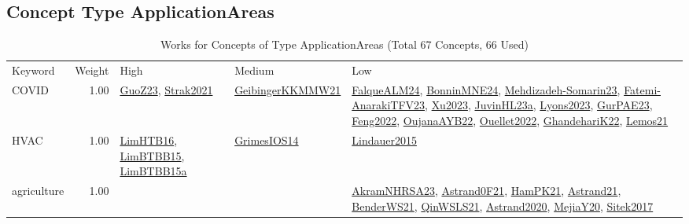 \subsection{Concept Type ApplicationAreas}
\label{sec:ApplicationAreas}
\label{ApplicationAreas}
{\scriptsize
\begin{longtable}{p{3cm}r>{\raggedright\arraybackslash}p{6cm}>{\raggedright\arraybackslash}p{6cm}>{\raggedright\arraybackslash}p{8cm}}
\rowcolor{white}\caption{Works for Concepts of Type ApplicationAreas (Total 67 Concepts, 66 Used)}\\ \toprule
\rowcolor{white}Keyword & Weight & High & Medium & Low\\ \midrule\endhead
\bottomrule
\endfoot
\index{COVID}\index{ApplicationAreas!COVID}COVID &  1.00 & \hyperref[detail:GuoZ23]{GuoZ23}, \hyperref[detail:Strak2021]{Strak2021} & \hyperref[detail:GeibingerKKMMW21]{GeibingerKKMMW21} & \hyperref[detail:FalqueALM24]{FalqueALM24}, \hyperref[detail:BonninMNE24]{BonninMNE24}, \hyperref[detail:Mehdizadeh-Somarin23]{Mehdizadeh-Somarin23}, \hyperref[detail:Fatemi-AnarakiTFV23]{Fatemi-AnarakiTFV23}, \hyperref[detail:Xu2023]{Xu2023}, \hyperref[detail:JuvinHL23a]{JuvinHL23a}, \hyperref[detail:Lyons2023]{Lyons2023}, \hyperref[detail:GurPAE23]{GurPAE23}, \hyperref[detail:Feng2022]{Feng2022}, \hyperref[detail:OujanaAYB22]{OujanaAYB22}, \hyperref[detail:Ouellet2022]{Ouellet2022}, \hyperref[detail:GhandehariK22]{GhandehariK22}, \hyperref[detail:Lemos21]{Lemos21}\\
\index{HVAC}\index{ApplicationAreas!HVAC}HVAC &  1.00 & \hyperref[detail:LimHTB16]{LimHTB16}, \hyperref[detail:LimBTBB15]{LimBTBB15}, \hyperref[detail:LimBTBB15a]{LimBTBB15a} & \hyperref[detail:GrimesIOS14]{GrimesIOS14} & \hyperref[detail:Lindauer2015]{Lindauer2015}\\
\index{agriculture}\index{ApplicationAreas!agriculture}agriculture &  1.00 &  &  & \hyperref[detail:AkramNHRSA23]{AkramNHRSA23}, \hyperref[detail:Astrand0F21]{Astrand0F21}, \hyperref[detail:HamPK21]{HamPK21}, \hyperref[detail:Astrand21]{Astrand21}, \hyperref[detail:BenderWS21]{BenderWS21}, \hyperref[detail:QinWSLS21]{QinWSLS21}, \hyperref[detail:Astrand2020]{Astrand2020}, \hyperref[detail:MejiaY20]{MejiaY20}, \hyperref[detail:Sitek2017]{Sitek2017}\\

\end{longtable}}

